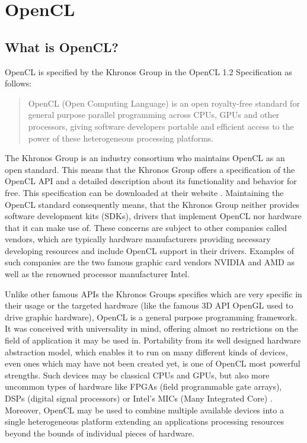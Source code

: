 \chapter{OpenCL}
\label{sec:opencl}

\section{What is OpenCL?}
OpenCL is specified by the Khronos Group in the OpenCL 1.2 Specification as follows:

\begin{quote}
OpenCL (Open Computing Language) is an open royalty-free standard for general purpose
parallel programming across CPUs, GPUs and other processors, giving software developers
portable and efficient access to the power of these heterogeneous processing platforms. \cite{opencl_spec}
\end{quote}

The Khronos Group is an industry consortium who maintains OpenCL as an open standard. This means that the Khronos Group offers a specification of the OpenCL API and a detailed description about its functionality and behavior for free. This specification can be downloaded at their website \cite{opencl_spec}. Maintaining the OpenCL standard consequently means, that the Khronos Group neither provides software development kits (SDKs), drivers that implement OpenCL nor hardware that it can make use of. These concerns are subject to other companies called vendors, which are typically hardware manufacturers providing necessary developing resources and include OpenCL support in their drivers. Examples of such companies are the two famous graphic card vendors NVIDIA and AMD as well as the renowned processor manufacturer Intel.

Unlike other famous APIs the Khronos Groups specifies which are very specific in their usage or the targeted hardware (like the famous 3D API OpenGL used to drive graphic hardware), OpenCL is a general purpose programming framework. It was conceived with universality in mind, offering almost no restrictions on the field of application it may be used in. Portability from its well designed hardware abstraction model, which enables it to run on many different kinds of devices, even ones which may have not been created yet, is one of OpenCL most powerful strengths. Such devices may be classical CPUs and GPUs, but also more uncommon types of hardware like FPGAs (field programmable gate arrays), DSPs (digital signal processors) or Intel's MICs (Many Integrated Core) \cite{mic}. Moreover, OpenCL may be used to combine multiple available devices into a single heterogeneous platform extending an applications processing resources beyond the bounds of individual pieces of hardware.

